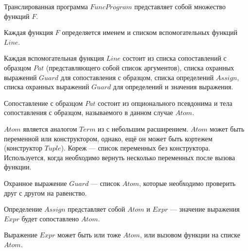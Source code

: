 Транслированная программа $FuncProgram$ представляет собой множество функций $F$.

Каждая функция $F$ определяется именем и списком вспомогательных функций $Line$.

Каждая вспомогательная функция $Line$ состоит из списка сопоставлений с образцом $Pat$ (представляющего собой список аргументов), списка охранных выражений $Guard$ для сопоставления с образцом, списка определений $Assign$, списка охранных выражений $Guard$ для определений и значения выражения.

Сопоставление с образцом $Pat$ состоит из опционального псевдонима и тела сопоставления с образцом, называемого в данном случае $Atom$.

$Atom$ является аналогом $Term$ из \miniKanren{} с небольшим расширением.
$Atom$ может быть переменной или конструктором, однако, ещё он может быть кортежем (конструктор $Tuple$).
Кореж --- список переменных без конструктора.
Используется, когда необходимо вернуть несколько переменных после вызова функции.

Охранное выражение $Guard$ --- список $Atom$, которые необходимо проверить друг с другом на равенство.

Определение $Assign$ представляет собой $Atom$ и $Expr$ --- значение выражения $Expr$ будет сопоставлено $Atom$.

Выражение $Expr$ может быть или тоже $Atom$, или вызовом функции на списке $Atom$.
